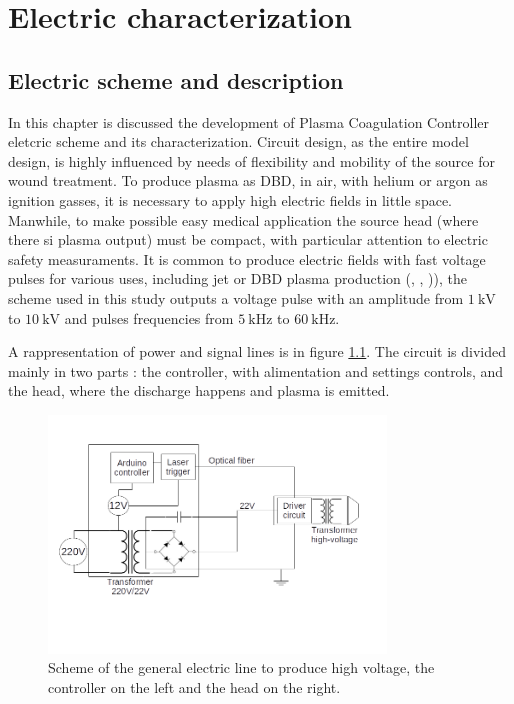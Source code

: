 \chapter{Electric characterization}
\label{ch:electric}
\section{Electric scheme and description}
In this chapter is discussed the development of Plasma Coagulation Controller eletcric scheme and its characterization. Circuit design, as the entire model design, is highly influenced by needs of flexibility and mobility of the source for wound treatment. To produce plasma as DBD, in air, with helium or argon as ignition gasses, it is necessary to apply high electric fields in little space. Manwhile, to make possible easy medical application the source head (where there si plasma output) must be compact, with particular attention to electric safety measuraments.
It is common to produce electric fields with fast voltage pulses for various uses, including jet or DBD plasma production (\cite{Upadhyay:hvpulse}, \cite{Jarrige:plumecharacteristics}, \cite{Darny:jetplume})), the scheme used in this study outputs a voltage pulse with an amplitude from $\SI{1}{\kilo\volt}$ to $\SI{10}{\kilo\volt}$ and pulses frequencies from $\SI{5}{\kilo\hertz}$ to $\SI{60}{\kilo\hertz}$.

A rappresentation of power and signal lines is in figure \ref{fig:electricline}. The circuit is divided mainly in two parts %
: the controller, with alimentation and settings controls, and the head, where the discharge happens and plasma is emitted.
\begin{figure}
 \centering
 \includegraphics[width=0.8\textwidth]{Images/Electric/Linea_elettrica.png}
 \caption{Scheme of the general electric line to produce high voltage, the controller on the left and the head on the right.}
 \label{fig:electricline}
\end{figure}

